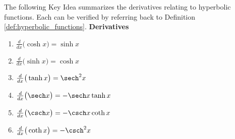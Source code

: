 
The following Key Idea summarizes the derivatives relating to hyperbolic functions. Each can be verified by referring back to Definition \ref{def:hyperbolic_functions}.
\textbf{Derivatives}
\begin{enumerate}
\item $\frac{d}{dx}\big(\cosh x\big) = \sinh x$
\item $\frac{d}{dx}\big(\sinh x\big) = \cosh x$
\item $\frac{d}{dx}\big(\tanh x\big) = \sech^2 x$
\item $\frac{d}{dx}\big(\sech x\big) = -\sech x\tanh x$
\item $\frac{d}{dx}\big(\csch x\big) = -\csch x\coth x$
\item $\frac{d}{dx}\big(\coth x\big) = -\csch^2x$
\end{enumerate}


